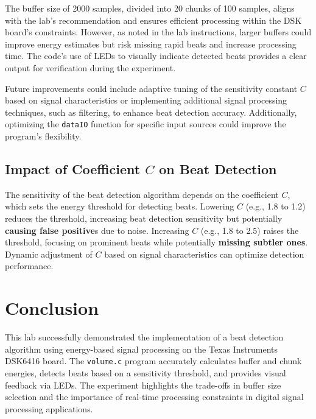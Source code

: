 \documentclass{article}
\begin{document}
The buffer size of 2000 samples, divided into 20 chunks of 100 samples, aligns with the lab's recommendation and ensures efficient processing within the DSK board's constraints. However, as noted in the lab instructions, larger buffers could improve energy estimates but risk missing rapid beats and increase processing time. The code's use of LEDs to visually indicate detected beats provides a clear output for verification during the experiment.

Future improvements could include adaptive tuning of the sensitivity constant $C$ based on signal characteristics or implementing additional signal processing techniques, such as filtering, to enhance beat detection accuracy. Additionally, optimizing the \texttt{dataIO} function for specific input sources could improve the program's flexibility.

\subsection*{Impact of Coefficient \( C \) on Beat Detection}
The sensitivity of the beat detection algorithm depends on the coefficient \( C \), which sets the energy threshold for detecting beats. Lowering \( C \) (e.g., 1.8 to 1.2) reduces the threshold, increasing beat detection sensitivity but potentially \textbf{causing false positive}s due to noise. Increasing \( C \) (e.g., 1.8 to 2.5) raises the threshold, focusing on prominent beats while potentially\textbf{ missing subtler ones}. Dynamic adjustment of \( C \) based on signal characteristics can optimize detection performance.


\section*{Conclusion}
This lab successfully demonstrated the implementation of a beat detection algorithm using energy-based signal processing on the Texas Instruments DSK6416 board. The \texttt{volume.c} program accurately calculates buffer and chunk energies, detects beats based on a sensitivity threshold, and provides visual feedback via LEDs. The experiment highlights the trade-offs in buffer size selection and the importance of real-time processing constraints in digital signal processing applications.
\end{document}
